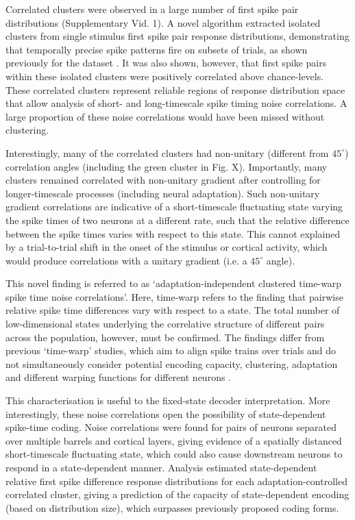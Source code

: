 \documentclass{article}
\begin{document}
Correlated clusters were observed in a large number of first spike pair distributions (Supplementary Vid. 1). A novel algorithm extracted isolated clusters from single stimulus first spike pair response distributions, demonstrating that temporally precise spike patterns fire on subsets of trials, as shown previously for the dataset \cite{reyes2014laminar}. It was also shown, however, that first spike pairs within these isolated clusters were positively correlated above chance-levels. These correlated clusters represent reliable regions of response distribution space that allow analysis of short- and long-timescale spike timing noise correlations. A large proportion of these noise correlations would have been missed without clustering. 

Interestingly, many of the correlated clusters had non-unitary (different from $45^{\circ}$) correlation angles (including the green cluster in Fig. X).
Importantly, many clusters remained correlated with non-unitary gradient after controlling for longer-timescale processes (including neural adaptation). Such non-unitary gradient correlations are indicative of a short-timescale fluctuating state varying the spike times of two neurons at a different rate, such that the relative difference between the spike times varies with respect to this state.
This cannot explained by a trial-to-trial shift in the onset of the stimulus or cortical activity, which would produce correlations with a unitary gradient (i.e. a $45^{\circ}$ angle). 

This novel finding is referred to as `adaptation-independent clustered time-warp spike time noise correlations'. Here, time-warp refers to the finding that pairwise relative spike time differences vary with respect to a state.
The total number of low-dimensional states underlying the correlative structure of different pairs across the population, however, must be confirmed. 
The findings differ from previous `time-warp' studies, which aim to align spike trains over trials and do not simultaneously consider potential encoding capacity, clustering, adaptation and different warping functions for different neurons \cite{williams2020discovering}. 

This characterisation is useful to the fixed-state decoder interpretation. More interestingly, these noise correlations open the possibility of state-dependent spike-time coding. Noise correlations were found for pairs of neurons separated over multiple barrels and cortical layers, giving evidence of a spatially distanced short-timescale fluctuating state, which could also cause downstream neurons to respond in a state-dependent manner. Analysis estimated state-dependent relative first spike difference response distributions for each adaptation-controlled correlated cluster, giving a prediction of the capacity of state-dependent encoding (based on distribution size), which surpasses previously proposed coding forms. 
\end{document}
